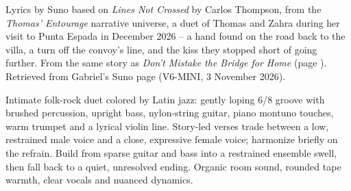 
\label{sec:stopped-before-the-edge}
\begin{notes}
Lyrics by Suno based on \emph{Lines Not Crossed} by Carlos Thompson, from the \emph{Thomas' Entourage} narrative universe, a duet of Thomas and Zahra during her visit to Punta Espada in December 2026 -- a hand found on the road back to the villa, a turn off the convoy's line, and the kiss they stopped short of going further. From the same story as \emph{Don't Mistake the Bridge for Home} (page \pageref{sec:dont-mistake-the-bridge-for-home}). Retrieved from Gabriel's Suno page (V6-MINI, 3 November 2026).
\end{notes}
\begin{style}
Intimate folk-rock duet colored by Latin jazz: gently loping 6/8 groove with brushed percussion, upright bass, nylon-string guitar, piano montuno touches, warm trumpet and a lyrical violin line. Story-led verses trade between a low, restrained male voice and a close, expressive female voice; harmonize briefly on the refrain. Build from sparse guitar and bass into a restrained ensemble swell, then fall back to a quiet, unresolved ending. Organic room sound, rounded tape warmth, clear vocals and nuanced dynamics.
\end{style}
